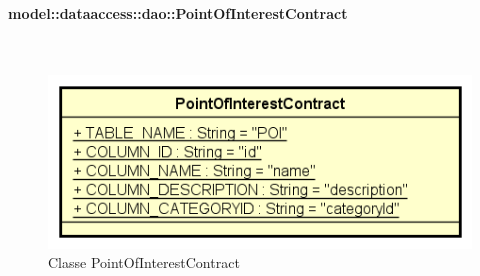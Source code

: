\documentclass[../DefinizioneDiProdotto.tex]{subfiles}
\begin{document}
\paragraph{model::dataaccess::dao::PointOfInterestContract}
\
\begin{figure}[H]
	\centering
	\includegraphics[width=\maxwidth]{img/PointOfInterestContract.png}
	\caption{Classe PointOfInterestContract}\label{fig:model::dataaccess::dao::PointOfInterestContract} 
\end{figure}
\end{document}
